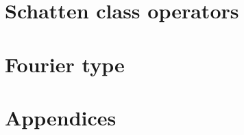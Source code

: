 \documentclass[a4paper,10pt,intlimits,sumlimits]{amsbook}
\begin{document}
\chapter{Schatten class operators}
\label{sec:schatten}


\chapter{Fourier type}
\label{sec:fouriertype}


\chapter{Appendices}
\label{sec:appendices}








 
\end{document}
